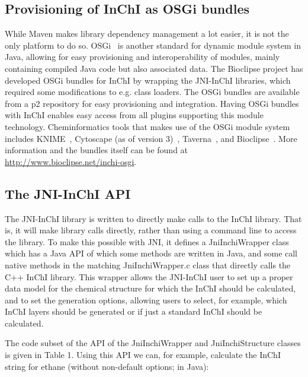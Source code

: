 \documentclass[10pt]{bmc_article}
\newenvironment{bmcformat}{\fussy\setboolean{publ}{true}}{\fussy}
\begin{document}
\begin{bmcformat}
\subsection*{Provisioning of InChI as OSGi bundles}

While Maven makes library dependency management a lot easier, it is not the only platform to do so.
OSGi~\cite{osgi} is another standard for dynamic module system in Java, allowing for easy provisioning and interoperability of modules, mainly containing compiled Java code but also associated data. The Bioclipse project has developed OSGi bundles for InChI by wrapping the JNI-InChI libraries, which required some modifications to e.g. class loaders. The OSGi bundles are available from a p2 repository for easy provisioning and integration. Having OSGi bundles with InChI enables easy access from all plugins supporting this module technology. Cheminformatics tools that makes use of the OSGi module system includes KNIME~\cite{Warr:2012kx}, Cytoscape (as of version 3)~\cite{Shannon:2003zr},
Taverna~\cite{Oinn:2004ys,Truszkowski:2011vn}, and Bioclipse~\cite{Spjuth:2007ve}. 
More information and the bundles itself can be found at \url{http://www.bioclipse.net/inchi-osgi}.

\subsection*{The JNI-InChI API}

The JNI-InChI library is written to directly make calls to the InChI library. That is, it will make library calls
directly, rather than using a command line to access the library. To make this possible with JNI, it defines a
JniInchiWrapper class which has a Java API of which some methods are written in Java, and some call native
methods in the matching JniInchiWrapper.c class that directly calls the C++ InChI library.
This wrapper allows the JNI-InChI user to set up a proper data model for the chemical structure for which the
InChI should be calculated, and to set the generation options, allowing users to select, for example, which
InChI layers should be generated or if just a standard InChI should be calculated.

The code subset of the API of the JniInchiWrapper and JniInchiStructure classes is given in Table 1. Using this
API we can, for example, calculate the InChI string for ethane (without non-default options; in Java):


\end{bmcformat}
\end{document}
